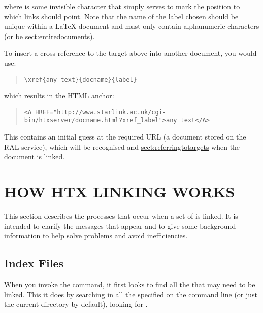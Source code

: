 where  is some invisible character that simply serves to mark
the position to which links should point. Note that the name of the
label chosen should be unique within a \mbox{\LaTeX} document and must
only contain alphanumeric characters (or be \hyperref{blank}{blank --
see \S}{}{sect:entiredocuments}).

To insert a cross-reference to the target above into another document,
you would use:

\begin{quote}
\begin{verbatim}
\xref{any text}{docname}{label}
\end{verbatim}
\end{quote}

which results in the HTML anchor:

\begin{quote}
\begin{verbatim}
<A HREF="http://www.starlink.ac.uk/cgi-bin/htxserver/docname.html?xref_label">any text</A>
\end{verbatim}
\end{quote}

This contains an initial guess at the required URL (a document stored on the
RAL service), which will be recognised and
\hyperref{modified as necessary}{modified as necessary (see \S}{)}{sect:referringtotargets} when the
document is linked.

\section{\label{sect:howlinkingworks}HOW HTX LINKING WORKS}

This section describes the processes that occur when a set of
 is linked. It is intended to clarify the
messages that appear and to give some background information to help
solve problems and avoid inefficiencies.

\subsection{\label{sect:indexfiles}Index Files}

When you invoke the  command, it first looks to
find all the  that may need to be linked. This it
does by searching in all the  specified on
the command line (or just the current directory by default), looking
for .

